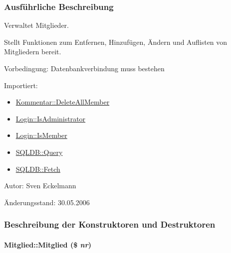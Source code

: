 \subsubsection{Ausf\"{u}hrliche Beschreibung}
Verwaltet Mitglieder. 

Stellt Funktionen zum Entfernen, Hinzufügen, Ändern und Auflisten von Mitgliedern bereit. \begin{Desc}
\item[Vorbedingung:]Datenbankverbindung muss bestehen \end{Desc}
\begin{Desc}
\item[Importiert:]\begin{itemize}
\item \hyperlink{classKommentar_92a8fcea1b065341c7c53e8a8464fcf0}{Kommentar::Delete\-All\-Member}\item \hyperlink{classLogin_6c120224aa6719f58c6ccd08acc28758}{Login::Is\-Administrator}\item \hyperlink{classLogin_70d2747b0aa454f4203a789afea25318}{Login::Is\-Member}\item \hyperlink{classSQLDB_fc6ffa8df50f68f07d9f5e3385b96d7a}{SQLDB::Query}\item \hyperlink{classSQLDB_a55c00ce1de0e50e0a58cae61892ba35}{SQLDB::Fetch}\end{itemize}
\end{Desc}
\begin{Desc}
\item[Autor:]Sven Eckelmann \end{Desc}
\begin{Desc}
\item[Änderungsstand:]30.05.2006 \end{Desc}




\subsubsection{Beschreibung der Konstruktoren und Destruktoren}
\hypertarget{classMitglied_0ee18db6476bcb6d71d30978eb69c7ae}{
\paragraph[Mitglied]{\setlength{\rightskip}{0pt plus 5cm}Mitglied::Mitglied (\$ {\em nr})}\hfill}
\label{classMitglied_0ee18db6476bcb6d71d30978eb69c7ae}


